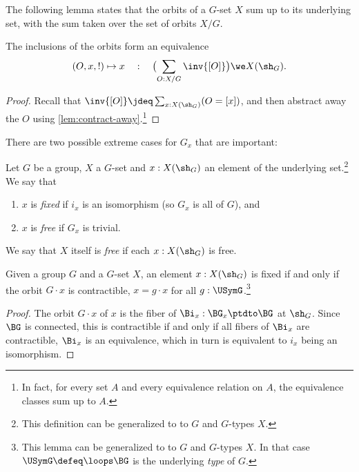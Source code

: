 The following lemma states that the orbits of a $G$-set $X$
sum up to its underlying set, with the sum taken over the set
of orbits $X/G$.

\begin{lemma}
  \label{lem:splitting into orbits}
  The inclusions of the orbits form an equivalence
\[
  (O,x,!)\mapsto x \quad:\quad
  \bigl(\sum_{O:X/G} \inv{[O]} \bigr) \we X(\sh_G).
\]
\end{lemma}
\begin{proof}
Recall that $\inv{[O]}\jdeq \sum_{x:X(\sh_G)}(O=[x])$, 
and then abstract
away the $O$ using \cref{lem:contract-away}.\footnote{%
In fact, for every set $A$ and every equivalence relation on $A$,
the equivalence classes sum up to $A$.}
\end{proof}

There are two possible extreme cases for $G_x$ that are important:
\begin{definition}\label{def:fixed-free}
  Let $G$ be a group, $X$ a $G$-set and $x:X(\sh_G)$ an element of the underlying set.\footnote{%
  This definition can be generalized to to \inftygps $G$ and $G$-types $X$.}
  We say that
  \begin{enumerate}
  \item $x$ is \emph{fixed}
    if $i_x$ is an isomorphism (so $G_x$ is all of $G$), and
  \item $x$ is \emph{free}
    if $G_x$ is trivial.
  \end{enumerate}
  We say that $X$ itself is \emph{free} if each $x:X(\sh_G)$ is free.
\end{definition}

\begin{lemma}\label{lem:fixed-char}
  Given a group $G$ and a $G$-set $X$, an element $x:X(\sh_G)$ is
 fixed if and only if the orbit $G\cdot x$ is contractible,
  \ie $x = g\cdot x$ for all $g:\USymG$.\footnote{%
  This lemma can be generalized to to \inftygps $G$ and $G$-types $X$.
  In that case $\USymG\defeq\loops\BG$ is the underlying \emph{type} of $G$.}
\end{lemma}
\begin{proof}
  The orbit $G\cdot x$ of $x$ is the fiber of $\Bi_x : \BG_x \ptdto \BG$
  at $\sh_G$. Since $\BG$ is connected,
  this is contractible if and only if all fibers of $\Bi_x$ are contractible,
  \ie $\Bi_x$ is an equivalence, which in turn is equivalent to $i_x$
  being an isomorphism.
\end{proof}

